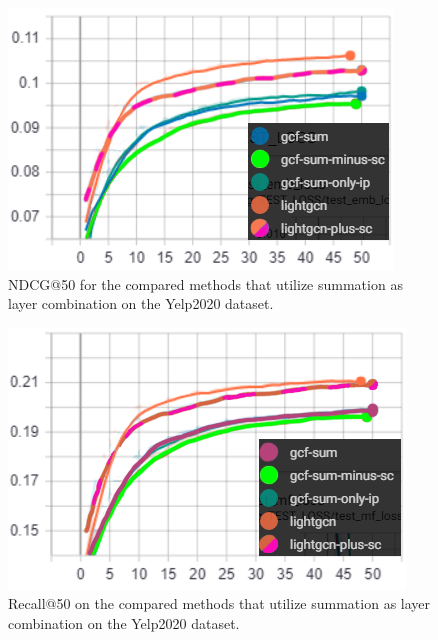 \begin{figure}[]
    \includegraphics[width=\linewidth]{figures/gcf-sum-ndcg.png}
    \caption{NDCG@50 for the compared methods that utilize summation as layer combination on the Yelp2020 dataset.}
    \label{fig:GCF-sum-NDCG-ablation-study}
\end{figure}
\begin{figure}[]
    \includegraphics[width=\linewidth]{figures/gcf-sum-recall.png}
    \caption{Recall@50 on the compared methods that utilize summation as layer combination on the Yelp2020 dataset.}
    \label{fig:GCF-sum-recall-ablation-study}
\end{figure}

